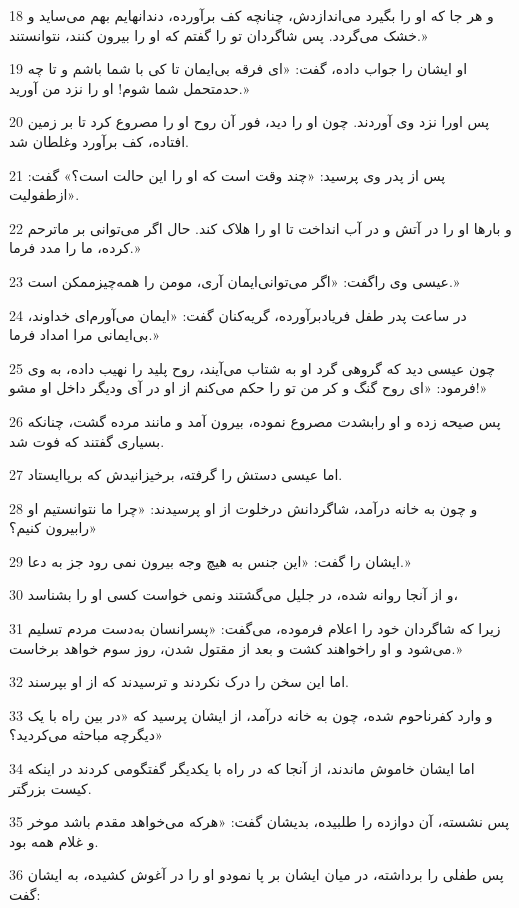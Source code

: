 \par 18 و هر جا که او را بگیرد می‌اندازدش، چنانچه کف برآورده، دندانهایم بهم می‌ساید و خشک می‌گردد. پس شاگردان تو را گفتم که او را بیرون کنند، نتوانستند.»
\par 19 او ایشان را جواب داده، گفت: «ای فرقه بی‌ایمان تا کی با شما باشم و تا چه حدمتحمل شما شوم! او را نزد من آورید.»
\par 20 پس اورا نزد وی آوردند. چون او را دید، فور آن روح او را مصروع کرد تا بر زمین افتاده، کف برآورد وغلطان شد.
\par 21 پس از پدر وی پرسید: «چند وقت است که او را این حالت است؟» گفت: «ازطفولیت.
\par 22 و بارها او را در آتش و در آب انداخت تا او را هلاک کند. حال اگر می‌توانی بر ماترحم کرده، ما را مدد فرما.»
\par 23 عیسی وی راگفت: «اگر می‌توانی‌ایمان آری، مومن را همه‌چیزممکن است.»
\par 24 در ساعت پدر طفل فریادبرآورده، گریه‌کنان گفت: «ایمان می‌آورم‌ای خداوند، بی‌ایمانی مرا امداد فرما.»
\par 25 چون عیسی دید که گروهی گرد او به شتاب می‌آیند، روح پلید را نهیب داده، به وی فرمود: «ای روح گنگ و کر من تو را حکم می‌کنم از او در آی ودیگر داخل او مشو!»
\par 26 پس صیحه زده و او رابشدت مصروع نموده، بیرون آمد و مانند مرده گشت، چنانکه بسیاری گفتند که فوت شد.
\par 27 اما عیسی دستش را گرفته، برخیزانیدش که برپاایستاد.
\par 28 و چون به خانه در‌آمد، شاگردانش درخلوت از او پرسیدند: «چرا ما نتوانستیم او رابیرون کنیم؟»
\par 29 ایشان را گفت: «این جنس به هیچ وجه بیرون نمی رود جز به دعا.»
\par 30 و از آنجا روانه شده، در جلیل می‌گشتند ونمی خواست کسی او را بشناسد،
\par 31 زیرا که شاگردان خود را اعلام فرموده، می‌گفت: «پسرانسان به‌دست مردم تسلیم می‌شود و او راخواهند کشت و بعد از مقتول شدن، روز سوم خواهد برخاست.»
\par 32 اما این سخن را درک نکردند و ترسیدند که از او بپرسند.
\par 33 و وارد کفرناحوم شده، چون به خانه درآمد، از ایشان پرسید که «در بین راه با یک دیگرچه مباحثه می‌کردید؟»
\par 34 اما ایشان خاموش ماندند، از آنجا که در راه با یکدیگر گفتگومی کردند در اینکه کیست بزرگتر.
\par 35 پس نشسته، آن دوازده را طلبیده، بدیشان گفت: «هر‌که می‌خواهد مقدم باشد موخر و غلام همه بود.
\par 36 پس طفلی را برداشته، در میان ایشان بر پا نمودو او را در آغوش کشیده، به ایشان گفت:
